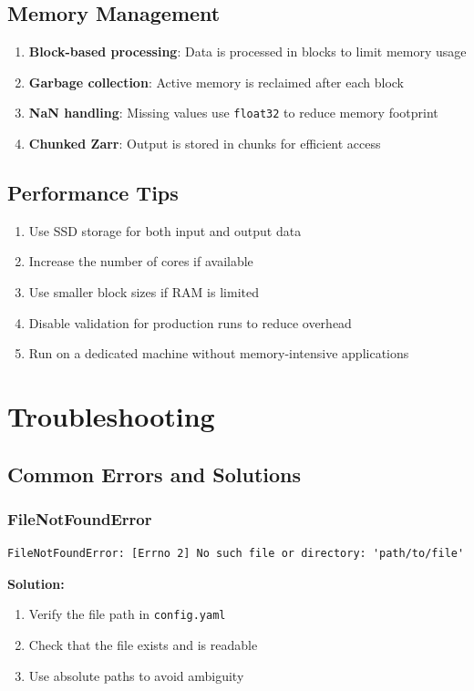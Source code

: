 ﻿\documentclass[12pt,a4paper]{report}
\begin{document}
\section{Memory Management}
\begin{enumerate}
    \item \textbf{Block-based processing}: Data is processed in blocks to limit memory usage
    \item \textbf{Garbage collection}: Active memory is reclaimed after each block
    \item \textbf{NaN handling}: Missing values use \texttt{float32} to reduce memory footprint
    \item \textbf{Chunked Zarr}: Output is stored in chunks for efficient access
\end{enumerate}

\section{Performance Tips}
\begin{enumerate}
    \item Use SSD storage for both input and output data
    \item Increase the number of cores if available
    \item Use smaller block sizes if RAM is limited
    \item Disable validation for production runs to reduce overhead
    \item Run on a dedicated machine without memory-intensive applications
\end{enumerate}

\chapter{Troubleshooting}

\section{Common Errors and Solutions}
\subsection{FileNotFoundError}
\begin{lstlisting}[caption=FileNotFoundError]
FileNotFoundError: [Errno 2] No such file or directory: 'path/to/file'
\end{lstlisting}
\textbf{Solution:}
\begin{enumerate}
    \item Verify the file path in \texttt{config.yaml}
    \item Check that the file exists and is readable
    \item Use absolute paths to avoid ambiguity
\end{enumerate}
\end{document}
